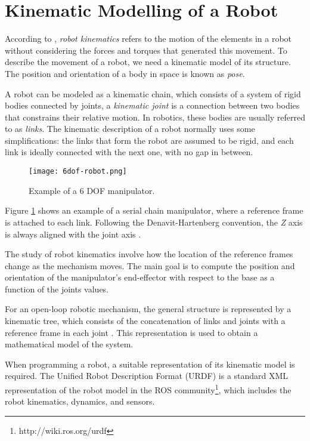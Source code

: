 \section{Kinematic Modelling of a Robot}

According to \citet{Handbook}, \textit{robot kinematics} refers to the motion of the elements in a robot without considering the forces and torques that generated this movement. 
To describe the movement of a robot, we need a kinematic model of its structure. The position and orientation of a body  in space is known as \textit{pose}.

A robot can be modeled as a kinematic chain, which consists of a system of rigid bodies connected by joints, a \textit{kinematic joint} is a connection between two bodies that constrains their relative motion. In robotics, these bodies are usually referred to as \textit{links}.  The kinematic description of a robot normally uses some simplifications: the links that form the robot are assumed to be rigid, and each link is ideally connected with the next one, with no gap in between.
\begin{figure}[H]
	\centering
	\texttt{[image: 6dof-robot.png]}
	\vspace{-10pt}
	\caption[Example of a 6 DOF manipulator]{Example of a 6 DOF manipulator. \citep[chap. 1, page 24]{Handbook}}
	\vspace{-15pt}
	\label{fig:kinematic}
\end{figure}

Figure \ref{fig:kinematic} shows an example of a serial chain manipulator, where a reference frame is attached to each link. Following the Denavit-Hartenberg convention, the \textit{Z} axis is always aligned with the joint axis \citep{Craig}.

The study of robot kinematics involve how the location of the reference frames change as the mechanism moves. The main goal is to compute the position and orientation of the manipulator's end-effector with respect to the base as a function of the joints values.

For an open-loop robotic mechanism, the general structure is represented by a kinematic tree, which consists of the concatenation of links and joints with a reference frame in each joint \citep{Handbook}. This representation is used to obtain a mathematical model of the system. 

When programming a robot, a suitable representation of its kinematic model is required. The Unified Robot Description Format (URDF) is a standard XML representation of the robot model in the ROS community\footnote{http://wiki.ros.org/urdf}, which includes the robot kinematics, dynamics, and sensors. %

